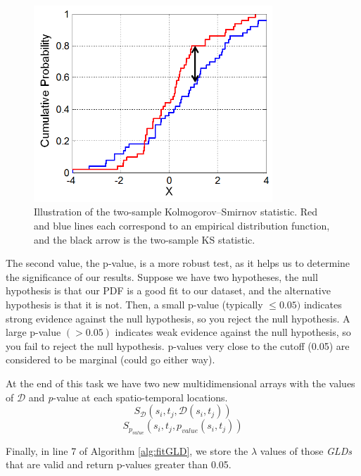 \begin{figure}[ht]
    \centering
    \includegraphics[width=0.8\textwidth]{img/D_distance.png}
    \caption{Illustration of the two-sample Kolmogorov–Smirnov statistic. Red and blue lines each correspond to an empirical distribution function, and the black arrow is the two-sample KS statistic.}
    \label{fig:D_distance}
\end{figure}

The second value, the p-value, is a more robust test, as it helps us to determine the significance of our results. Suppose we have two hypotheses, the null hypothesis  is that our PDF is a good fit to our dataset, and the alternative hypothesis  is that it is not. Then, a small p-value (typically $\leq 0.05)$ indicates strong evidence against the null hypothesis, so you reject the null hypothesis. A large p-value $(> 0.05)$ indicates weak evidence against the null hypothesis, so you fail to reject the null hypothesis. p-values very close to the cutoff (0.05) are considered to be marginal (could go either way). 

At the end of this task we have two new multidimensional arrays with the values of $\mathcal{D}$ and \textit{p}-value at each spatio-temporal locations.
\begin{equation}
S_{\mathcal{D}}(s_{i},t_{j},\mathcal{D}(s_{i},t_{j}))
\end{equation}
\begin{equation}
S_{p_{value}}(s_{i},t_{j},p_{value}(s_{i},t_{j}))
\end{equation}

Finally, in line 7 of Algorithm \ref{alg:fitGLD}, we store the $\lambda$ values of those \textit{GLDs} that are valid and return p-values greater than 0.05.

